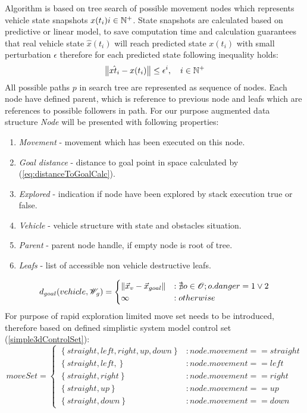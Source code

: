 Algorithm is based on tree search of possible movement nodes which represents vehicle state snapshots $x(t_i) i\in \mathbb{N}^+$. State snapshots are calculated based on predictive or linear model, to save computation time and calculation guarantees that real vehicle state $\hat{x}(t_i)$ will reach predicted state $x(t_i)$ with small perturbation $\epsilon$ therefore for each predicted state following inequality holds:
\begin{equation}\label{eq:marginalErrorofPrediction}
    \left\lVert\hat{x{t_i}}-x(t_i)\right\rVert\le \epsilon^i,\quad i \in \mathbb{N}^+
\end{equation}
All possible paths $p$ in search tree are represented as sequence of nodes. Each node have defined parent, which is reference to previous node and leafs which are references to possible followers in path. For our purpose augmented data structure \textit{Node} will be presented with following properties:
\begin{enumerate}
    \item \textit{Movement} - movement which has been executed on this node.
    \item \textit{Goal distance} - distance to goal point in space calculated by (\ref{eq:distanceToGoalCalc}).
    \item \textit{Explored} - indication if node have been explored by stack execution true or false.
    \item \textit{Vehicle} - vehicle structure with state and obstacles situation.
    \item \textit{Parent} - parent node handle, if empty node is root of tree. 
    \item \textit{Leafs} - list of accessible non vehicle destructive leafs.
\end{enumerate}
\begin{equation}\label{eq:distanceToGoalCalc}
    d_{goal}(vehicle,\mathscr{W}_g) = 
    \begin{cases}
        \left\lVert\vec{x}_v-\vec{x}_{goal}\right\rVert&:\nexists o \in \mathscr{O}; o.danger = 1 \vee 2\\
        \infty&:otherwise
    \end{cases}
\end{equation}
For purpose of rapid exploration limited move set needs to be introduced, therefore based on defined simplistic system model control set (\ref{simple3dControlSet}):
\begin{equation}\label{eq:rapidExplorationMovementSet}
    moveSet=
    \begin{cases}
        \left\{straight,left,right,up,down \right\} &: node.movement == straight\\
        \left\{straight,left, \right\} &: node.movement == left\\
        \left\{straight,right \right\} &: node.movement == right\\
        \left\{straight,up \right\} &: node.movement == up\\
        \left\{straight,down \right\} &: node.movement == down
    \end{cases}
\end{equation}
